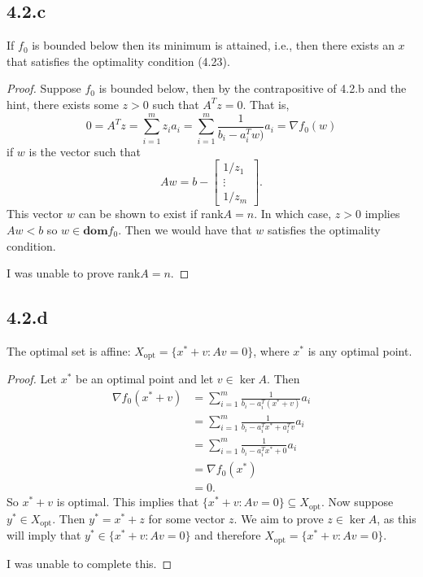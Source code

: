 \documentclass[12pt]{article}
\begin{document}
\subsection*{4.2.c}
If $f_0$ is bounded below then its minimum is attained, i.e., then there exists an $x$ that satisfies the optimality condition (4.23).

\begin{proof}
    Suppose $f_0$ is bounded below, then by the contrapositive of 4.2.b and the hint, there exists some $z>0$ such that $A^Tz=0$. That is,
    \[0 = A^Tz = \sum_{i=1}^mz_ia_i = \sum_{i=1}^m\frac1{b_i-a_i^Tw)}a_i = \nabla f_0(w)\]
    if $w$ is the vector such that
    \[Aw = b - 
        \begin{bmatrix}
            1/z_1 \\
            \vdots \\
            1/z_m
        \end{bmatrix}.
    \]
    This vector $w$ can be shown to exist if rank$A=n$. In which case, $z>0$ implies $Aw<b$ so $w\in\textbf{dom} f_0$. Then we would have that $w$ satisfies the optimality condition.
    
    I was unable to prove rank$A=n$.
    
\end{proof}

\subsection*{4.2.d}
The optimal set is affine: $X_\text{opt} = \{x^*+v : Av=0\}$, where $x^*$ is any optimal point.

\begin{proof}
    Let $x^*$ be an optimal point and let $v\in\ker A$. Then
    \begin{align*}
        \nabla f_0(x^*+v)
            &= \sum_{i=1}^m\frac1{b_i-a_i^T(x^*+v)}a_i \\
            &= \sum_{i=1}^m\frac1{b_i-a_i^Tx^*+a_i^Tv}a_i \\
            &= \sum_{i=1}^m\frac1{b_i-a_i^Tx^*+0}a_i \\
            &= \nabla f_0(x^*)\\
            &= 0.
    \end{align*}
    So $x^*+v$ is optimal. This implies that $\{x^*+v : Av=0\}\subseteq X_\text{opt}$. Now suppose $y^*\in X_\text{opt}$. Then $y^*=x^* + z$ for some vector $z$. We aim to prove $z\in\ker A$, as this will imply that $y^*\in\{x^*+v : Av=0\}$ and therefore $X_\text{opt}=\{x^*+v : Av=0\}$. 
    
    I was unable to complete this.
    
\end{proof}
\end{document}
